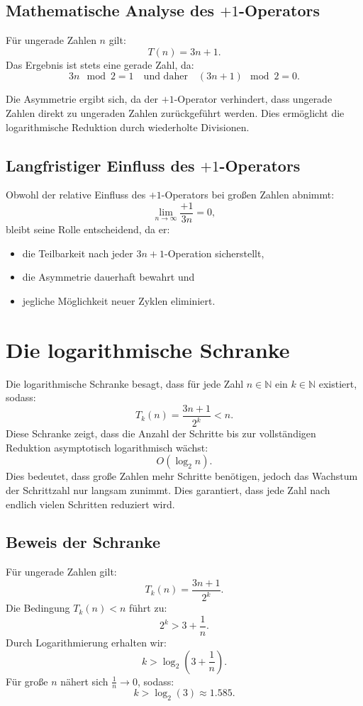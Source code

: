\documentclass[a4paper,12pt]{article}
\begin{document}
\subsection{Mathematische Analyse des \(+1\)-Operators}
Für ungerade Zahlen \( n \) gilt:
\[
T(n) = 3n + 1.
\]
Das Ergebnis ist stets eine gerade Zahl, da:
\[
3n \mod 2 = 1 \quad \text{und daher} \quad (3n + 1) \mod 2 = 0.
\]

Die Asymmetrie ergibt sich, da der \(+1\)-Operator verhindert, dass ungerade Zahlen direkt zu ungeraden Zahlen zurückgeführt werden. Dies ermöglicht die logarithmische Reduktion durch wiederholte Divisionen.

\subsection{Langfristiger Einfluss des \(+1\)-Operators}
Obwohl der relative Einfluss des \(+1\)-Operators bei großen Zahlen abnimmt:
\[
\lim_{n \to \infty} \frac{+1}{3n} = 0,
\]
bleibt seine Rolle entscheidend, da er:
\begin{itemize}
    \item die Teilbarkeit nach jeder \( 3n+1 \)-Operation sicherstellt,
    \item die Asymmetrie dauerhaft bewahrt und
    \item jegliche Möglichkeit neuer Zyklen eliminiert.
\end{itemize}

\section{Die logarithmische Schranke}
Die logarithmische Schranke besagt, dass für jede Zahl \( n \in \mathbb{N} \) ein \( k \in \mathbb{N} \) existiert, sodass:
\[
T_k(n) = \frac{3n + 1}{2^k} < n.
\]
Diese Schranke zeigt, dass die Anzahl der Schritte bis zur vollständigen Reduktion asymptotisch logarithmisch wächst:
\[
O(\log_2 n).
\]
Dies bedeutet, dass große Zahlen mehr Schritte benötigen, jedoch das Wachstum der Schrittzahl nur langsam zunimmt.
Dies garantiert, dass jede Zahl nach endlich vielen Schritten reduziert wird. 




\subsection{Beweis der Schranke}
Für ungerade Zahlen gilt:
\[
T_k(n) = \frac{3n + 1}{2^k}.
\]
Die Bedingung \( T_k(n) < n \) führt zu:
\[
2^k > 3 + \frac{1}{n}.
\]
Durch Logarithmierung erhalten wir:
\[
k > \log_2(3 + \frac{1}{n}).
\]
Für große \( n \) nähert sich \( \frac{1}{n} \to 0 \), sodass:
\[
k > \log_2(3) \approx 1.585.
\]
\end{document}
